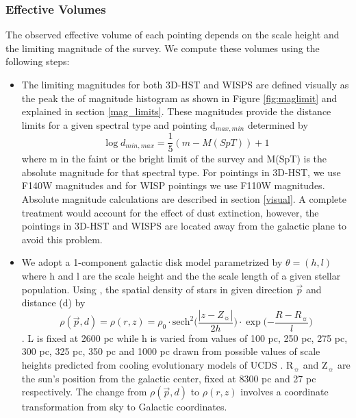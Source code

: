 \documentclass[manuscript]{aastex63}
\begin{document}
\subsubsection{ Effective Volumes}
The observed effective volume of each pointing depends on the scale height and the limiting magnitude of the survey. We compute these volumes using the following steps:
\begin{itemize}
\item The limiting magnitudes for both 3D-HST and WISPS are defined visually as the peak the of magnitude histogram as shown in Figure \ref{fig:maglimit} and explained in section \ref{mag_limits}. These magnitudes provide the distance limits for a given spectral type and pointing d$_{max, min}$ determined by \begin{equation} \log d_{min, max} =\frac{1}{5}(m-M(SpT))+1 \end{equation}
where m in the faint or the bright limit of the survey and M(SpT) is the absolute magnitude for that spectral type. For pointings in 3D-HST, we use F140W magnitudes and for WISP pointings we use F110W magnitudes. Absolute magnitude calculations are described in section \ref{visual}. A complete treatment would account for the effect of dust extinction, however, the pointings in 3D-HST and WISPS are located away from the galactic plane to avoid this problem.

\item We adopt a 1-component galactic disk model parametrized by $\theta=(h, l)$ where h and l are the scale height and the the scale length of a given stellar population. Using \cite{2004ApJS..155..191B}, the spatial density of stars in given direction $\vec{p}$ and distance (d) by
\begin{equation} \rho(\vec{p}, d) =\rho(r, z)= \rho _0 \cdot \text{sech} ^2 \biggl( {\frac{|z-Z_\sun|}{2h}} \biggl) \cdot \exp \biggl( {-\frac{R-R_\sun}{l}} \biggl)\end{equation}. L is fixed at 2600 pc while h is varied from values of 100 pc, 250 pc,  275 pc,  300 pc,  325 pc,  350 pc and 1000 pc drawn from possible values of scale heights predicted from cooling evolutionary models of UCDS  \citep{Ryan2017}. R$_\sun$ and Z$_\sun$ are the sun's position from the galactic center, fixed at 8300 pc and 27 pc respectively. The change from $\rho(\vec{p}, d)$ to $\rho(r, z)$ involves a coordinate transformation from sky to Galactic coordinates.


\end{itemize}
\end{document}
